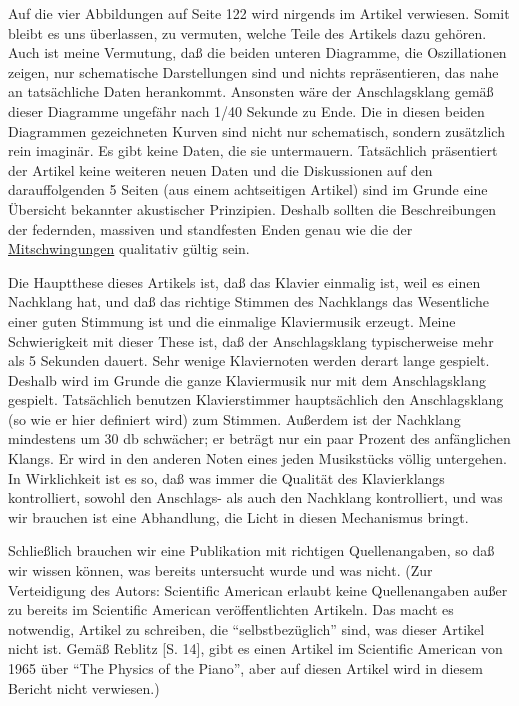 Auf die vier Abbildungen auf Seite 122 wird nirgends im Artikel verwiesen.
Somit bleibt es uns überlassen, zu vermuten, welche Teile des Artikels dazu gehören.
Auch ist meine Vermutung, daß die beiden unteren Diagramme, die Oszillationen zeigen, nur schematische Darstellungen sind und nichts repräsentieren, das nahe an tatsächliche Daten herankommt.
Ansonsten wäre der Anschlagsklang gemäß dieser Diagramme ungefähr nach 1/40 Sekunde zu Ende.
Die in diesen beiden Diagrammen gezeichneten Kurven sind nicht nur schematisch, sondern zusätzlich rein imaginär.
Es gibt keine Daten, die sie untermauern.
Tatsächlich präsentiert der Artikel keine weiteren neuen Daten und die Diskussionen auf den darauffolgenden 5 Seiten (aus einem achtseitigen Artikel) sind im Grunde eine Übersicht bekannter akustischer Prinzipien.
Deshalb sollten die Beschreibungen der federnden, massiven und standfesten Enden genau wie die der \hyperlink{mitschwingung}{Mitschwingungen} qualitativ gültig sein.

Die Hauptthese dieses Artikels ist, daß das Klavier einmalig ist, weil es einen Nachklang hat, und daß das richtige Stimmen des Nachklangs das Wesentliche einer guten Stimmung ist und die einmalige Klaviermusik erzeugt.
Meine Schwierigkeit mit dieser These ist, daß der Anschlagsklang typischerweise mehr als 5 Sekunden dauert.
Sehr wenige Klaviernoten werden derart lange gespielt.
Deshalb wird im Grunde die ganze Klaviermusik nur mit dem Anschlagsklang gespielt.
Tatsächlich benutzen Klavierstimmer hauptsächlich den Anschlagsklang (so wie er hier definiert wird) zum Stimmen.
Außerdem ist der Nachklang mindestens um 30 db schwächer; er beträgt nur ein paar Prozent des anfänglichen Klangs.
Er wird in den anderen Noten eines jeden Musikstücks völlig untergehen.
In Wirklichkeit ist es so, daß was immer die Qualität des Klavierklangs kontrolliert, sowohl den Anschlags- als auch den Nachklang kontrolliert, und was wir brauchen ist eine Abhandlung, die Licht in diesen Mechanismus bringt.

Schließlich brauchen wir eine Publikation mit richtigen Quellenangaben, so daß wir wissen können, was bereits untersucht wurde und was nicht.
(Zur Verteidigung des Autors: Scientific American erlaubt keine Quellenangaben außer zu bereits im Scientific American veröffentlichten Artikeln.
Das macht es notwendig, Artikel zu schreiben, die \enquote{selbstbezüglich} sind, was dieser Artikel nicht ist.
Gemäß Reblitz [S. 14], gibt es einen Artikel im Scientific American von 1965 über \enquote{The Physics of the Piano}, aber auf diesen Artikel wird in diesem Bericht nicht verwiesen.)


